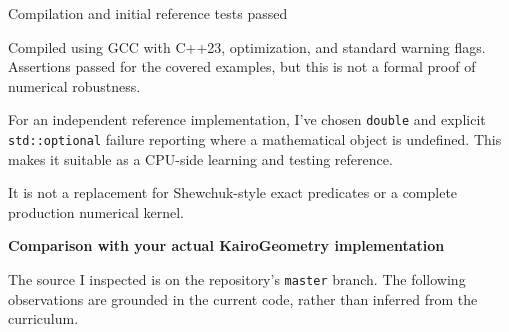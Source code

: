 Compilation and initial reference tests passed

Compiled using GCC with C++23, optimization, and standard warning flags. Assertions passed for the covered examples, but this is not a formal proof of numerical robustness.

For an independent reference implementation, I've chosen \texttt{double} and explicit \texttt{std::optional} failure reporting where a mathematical object is undefined. This makes it suitable as a CPU-side learning and testing reference.

It is not a replacement for Shewchuk-style exact predicates or a complete production numerical kernel.

\textbf{Comparison with your actual KairoGeometry implementation}

The source I inspected is on the repository's \texttt{master} branch. The following observations are grounded in the current code, rather than inferred from the curriculum.

